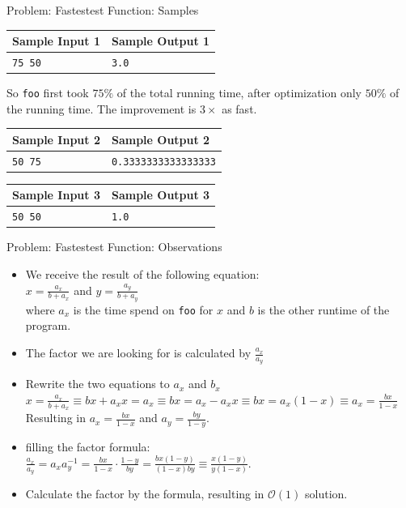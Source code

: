 \documentclass[11pt,pdf, aspectratio=169]{beamer}
\begin{document}
  \begin{frame}{Problem: Fastestest Function: Samples}
    \begin{tabular}{|l|l|}
      \hline
      \textbf{Sample Input 1} & \textbf{Sample Output 1} \\
      \hline
      \texttt{75 50}          & \texttt{3.0}             \\
      \hline
    \end{tabular}

    So \texttt{foo} first took $75\%$ of the total running time, after optimization only $50\%$ of the running time.
    The improvement is $3\times$ as fast.


    \begin{tabular}{|l|l|}
      \hline
      \textbf{Sample Input 2} & \textbf{Sample Output 2}    \\
      \hline
      \texttt{50 75}          & \texttt{0.3333333333333333} \\
      \hline
    \end{tabular}


    \begin{tabular}{|l|l|}
      \hline
      \textbf{Sample Input 3} & \textbf{Sample Output 3} \\
      \hline
      \texttt{50 50}          & \texttt{1.0}             \\
      \hline
    \end{tabular}
  \end{frame}
  \begin{frame}{Problem: Fastestest Function: Observations}
    \begin{itemize}
      \item We receive the result of the following equation:\\$x=\frac{a_x}{b+a_x}$ and $y=\frac{a_y}{b+a_y}$\\ where $a_x$ is the time spend on \texttt{foo} for $x$ and $b$ is the other runtime of the program.
      \item The factor we are looking for is calculated by $\frac{a_x}{a_y}$
      \item Rewrite the two equations to $a_x$ and $b_x$\\$x=\frac{a_x}{b+a_x} \equiv bx+a_{x}x = a_x \equiv bx = a_x - a_{x}x \equiv bx = a_x(1-x) \equiv a_x = \frac{bx}{1-x}$\\ Resulting in $a_x=\frac{bx}{1-x}$ and $a_y=\frac{by}{1-y}$.
      \item filling the factor formula:\\ $\frac{a_x}{a_y}= a_{x}a_{y}^{-1} = \frac{bx}{1-x}\cdot\frac{1-y}{by} = \frac{bx(1-y)}{(1-x)by} \equiv \frac{x(1-y)}{y(1-x)}$.
      \item Calculate the factor by the formula, resulting in $\mathcal{O}(1)$ solution.
    \end{itemize}
  \end{frame}
\end{document}

